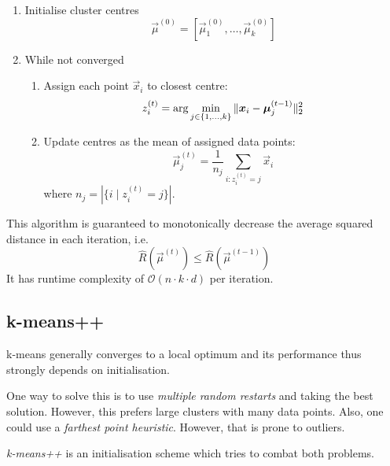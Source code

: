 \begin{enumerate}
    \item Initialise cluster centres
    \begin{equation*}
        \vec{\mu}^{(0)} = [\vec{\mu}^{(0)}_1, \dotsc, \vec{\mu}^{(0)}_k]
    \end{equation*}
    
    \item While not converged
    \begin{enumerate}
        \item Assign each point $\vec{x}_i$ to closest centre:
        \begin{equation*}
            z_i^{(t)} = \arg\min_{j \in \{1, \dotsc, k\}}{
                \lVert\boldsymbol{x}_i - \boldsymbol{\mu}_j^{(t - 1)}\rVert_2^2
            }
        \end{equation*}
        \item Update centres as the mean of assigned data points:
        \begin{equation*}
            \vec{\mu}_j^{(t)} = \frac{1}{n_j}
            \sum_{i : z_i^{(t)} = j}{\vec{x}_i}
        \end{equation*}
        where $n_j = |\{i \mid z_i^{(t)} = j\}|$.
    \end{enumerate}
\end{enumerate}

This algorithm is guaranteed to monotonically decrease
the average squared distance in each iteration, i.e.
\begin{equation*}
    \hat{R}(\vec{\mu}^{(t)}) \leq \hat{R}(\vec{\mu}^{(t-1)})
\end{equation*}
It has runtime complexity of $\mathcal{O}(n \cdot k \cdot d)$
per iteration.


\subsection{k-means++}
k-means generally converges to a local optimum and its
performance thus strongly depends on initialisation.

One way to solve this is to use \emph{multiple random restarts}
and taking the best solution.
However, this prefers large clusters with many data points.
Also, one could use a \emph{farthest point heuristic}.
However, that is prone to outliers.

\emph{k-means++} is an initialisation scheme which tries
to combat both problems.

